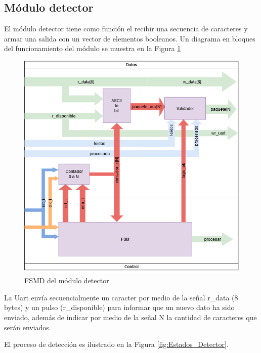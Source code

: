 	\subsection{Módulo detector}
	
		El módulo detector tiene como función el recibir una secuencia de caracteres y armar una salida con un vector de elementos booleanos. Un diagrama en bloques del funcionamiento del módulo se muestra en la Figura \ref{fig:FSMD_Detector}
		
		\begin{figure}[h]
		\centering
			\includegraphics[scale=.6]{./Figures/FSMD-Detector}
			\caption{FSMD del módulo detector}
			\label{fig:FSMD_Detector}
		\end{figure}
		
		\vspace{5cm}
		
		La Uart envía secuencialmente un caracter por medio de la señal r\_data (8 bytes) y un pulso (r\_disponible) para informar que un nuevo dato ha sido enviado, además de indicar por medio de la señal N la cantidad de caracteres que serán enviados. 
		
		El proceso de detección es ilustrado en la Figura \ref{fig:Estados_Detector}.  		
		
